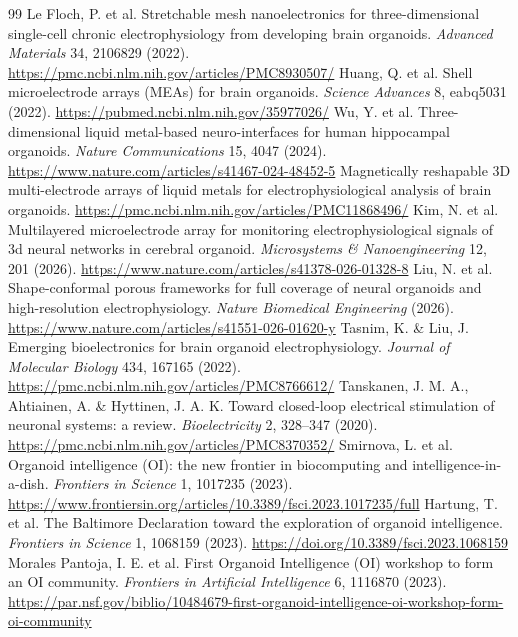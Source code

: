 \documentclass[10pt,twocolumn]{article}
\begin{document}
\begin{thebibliography}{99}
 Le Floch, P. et al. Stretchable mesh nanoelectronics for three-dimensional single-cell chronic electrophysiology from developing brain organoids. \emph{Advanced Materials} 34, 2106829 (2022). \url{https://pmc.ncbi.nlm.nih.gov/articles/PMC8930507/}
 Huang, Q. et al. Shell microelectrode arrays (MEAs) for brain organoids. \emph{Science Advances} 8, eabq5031 (2022). \url{https://pubmed.ncbi.nlm.nih.gov/35977026/}
 Wu, Y. et al. Three-dimensional liquid metal-based neuro-interfaces for human hippocampal organoids. \emph{Nature Communications} 15, 4047 (2024). \url{https://www.nature.com/articles/s41467-024-48452-5}
 Magnetically reshapable 3D multi-electrode arrays of liquid metals for electrophysiological analysis of brain organoids. \url{https://pmc.ncbi.nlm.nih.gov/articles/PMC11868496/}
 Kim, N. et al. Multilayered microelectrode array for monitoring electrophysiological signals of 3d neural networks in cerebral organoid. \emph{Microsystems \& Nanoengineering} 12, 201 (2026). \url{https://www.nature.com/articles/s41378-026-01328-8}
 Liu, N. et al. Shape-conformal porous frameworks for full coverage of neural organoids and high-resolution electrophysiology. \emph{Nature Biomedical Engineering} (2026). \url{https://www.nature.com/articles/s41551-026-01620-y}
 Tasnim, K. \& Liu, J. Emerging bioelectronics for brain organoid electrophysiology. \emph{Journal of Molecular Biology} 434, 167165 (2022). \url{https://pmc.ncbi.nlm.nih.gov/articles/PMC8766612/}
 Tanskanen, J. M. A., Ahtiainen, A. \& Hyttinen, J. A. K. Toward closed-loop electrical stimulation of neuronal systems: a review. \emph{Bioelectricity} 2, 328--347 (2020). \url{https://pmc.ncbi.nlm.nih.gov/articles/PMC8370352/}
 Smirnova, L. et al. Organoid intelligence (OI): the new frontier in biocomputing and intelligence-in-a-dish. \emph{Frontiers in Science} 1, 1017235 (2023). \url{https://www.frontiersin.org/articles/10.3389/fsci.2023.1017235/full}
 Hartung, T. et al. The Baltimore Declaration toward the exploration of organoid intelligence. \emph{Frontiers in Science} 1, 1068159 (2023). \url{https://doi.org/10.3389/fsci.2023.1068159}
 Morales Pantoja, I. E. et al. First Organoid Intelligence (OI) workshop to form an OI community. \emph{Frontiers in Artificial Intelligence} 6, 1116870 (2023). \url{https://par.nsf.gov/biblio/10484679-first-organoid-intelligence-oi-workshop-form-oi-community}

\end{thebibliography}
\end{document}
